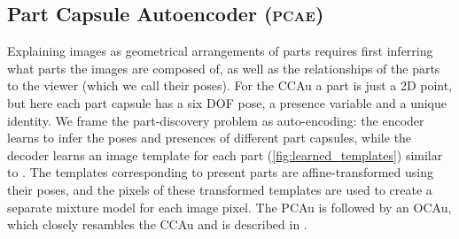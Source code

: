 
\subsection{Part Capsule Autoencoder (\textsc{pcae})}
\label{sec:img_capsule}
Explaining images as geometrical arrangements of parts requires first inferring what parts the images are composed of, as well as the relationships of the parts to the viewer (which we call their poses). For the \gls{CCAu} a part is just a 2D point, but here each part capsule has a six \gls{DOF} pose, a presence variable and a unique identity. We frame the part-discovery problem as auto-encoding: the encoder learns to infer the poses and presences of different part capsules, while the decoder learns an image template for each part (\cref{fig:learned_templates}) similar to \cite{Tieleman2014thesis,Eslami2016}. The templates corresponding to present parts are affine-transformed using their poses, and the pixels of these transformed templates are used to create a separate mixture model for each image pixel.
The \gls{PCAu} is followed by an \gls{OCAu}, which closely resambles the \gls{CCAu} and is described in .


